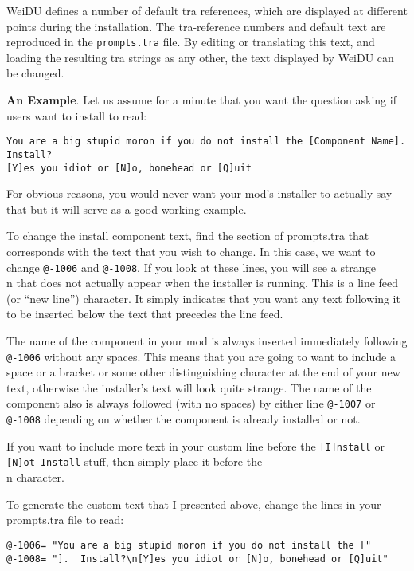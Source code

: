\documentclass{article}
\def\t#1{{\tt #1}}
\begin{document}
WeiDU defines a number of default tra references, which are displayed
at different points during the installation. The tra-reference numbers
and default text are reproduced in the \t{prompts.tra} file. By
editing or translating this text, and loading the resulting tra
strings as any other, the text displayed by WeiDU can be changed.

{\bf An Example}.
Let us assume for a minute that you want the question asking if users want
to install to read:
\begin{verbatim}
You are a big stupid moron if you do not install the [Component Name].
Install?
[Y]es you idiot or [N]o, bonehead or [Q]uit
\end{verbatim}

For obvious reasons, you would never want your mod's installer to
actually say that but it will serve as a good working example.

To change the install component text, find the section of prompts.tra that
corresponds with the text that you wish to change.  In this case, we want
to change \t{@-1006} and \t{@-1008}.  If you look at these lines, you will
see a strange \\n that does not actually appear when the installer is
running.  This is a line feed (or ``new line'') character.  It simply
indicates that you want any text following it to be inserted below the text
that precedes the line feed.

The name of the component in your mod is always inserted immediately
following \t{@-1006} without any spaces.  This means that you are going to
want to include a space or a bracket or some other distinguishing character
at the end of your new text, otherwise the installer's text will look
quite strange.  The name of the component also is always followed (with no
spaces) by either line \t{@-1007} or \t{@-1008} depending on whether the
component is already installed or not.

If you want to include more text in your custom line before the \t{[I]nstall} or
\t{[N]ot Install} stuff, then simply place it before the \\n character.

To generate the custom text that I presented above, change the lines in
your prompts.tra file to read:
\begin{verbatim}
@-1006= "You are a big stupid moron if you do not install the ["
@-1008= "].  Install?\n[Y]es you idiot or [N]o, bonehead or [Q]uit"
\end{verbatim}
\end{document}
